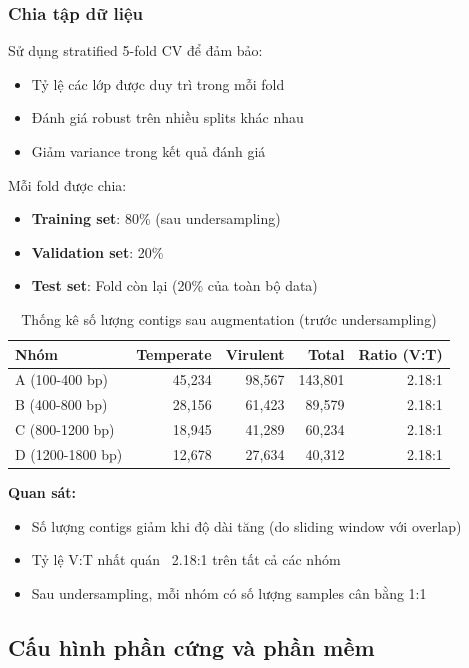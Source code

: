 \subsubsection{Chia tập dữ liệu}

Sử dụng stratified 5-fold CV để đảm bảo:
\begin{itemize}
    \item Tỷ lệ các lớp được duy trì trong mỗi fold
    \item Đánh giá robust trên nhiều splits khác nhau
    \item Giảm variance trong kết quả đánh giá
\end{itemize}

Mỗi fold được chia:
\begin{itemize}
    \item \textbf{Training set}: 80\% (sau undersampling)
    \item \textbf{Validation set}: 20\%
    \item \textbf{Test set}: Fold còn lại (20\% của toàn bộ data)
\end{itemize}

\begin{table}[h]
\centering
\caption{Thống kê số lượng contigs sau augmentation (trước undersampling)}
\label{tab:dataset_stats}
\begin{tabular}{lrrrr}
\toprule
\textbf{Nhóm} & \textbf{Temperate} & \textbf{Virulent} & \textbf{Total} & \textbf{Ratio (V:T)} \\
\midrule
A (100-400 bp) & 45,234 & 98,567 & 143,801 & 2.18:1 \\
B (400-800 bp) & 28,156 & 61,423 & 89,579 & 2.18:1 \\
C (800-1200 bp) & 18,945 & 41,289 & 60,234 & 2.18:1 \\
D (1200-1800 bp) & 12,678 & 27,634 & 40,312 & 2.18:1 \\
\bottomrule
\end{tabular}
\end{table}

\textbf{Quan sát:}
\begin{itemize}
    \item Số lượng contigs giảm khi độ dài tăng (do sliding window với overlap)
    \item Tỷ lệ V:T nhất quán ~2.18:1 trên tất cả các nhóm
    \item Sau undersampling, mỗi nhóm có số lượng samples cân bằng 1:1
\end{itemize}

\subsection{Cấu hình phần cứng và phần mềm}

